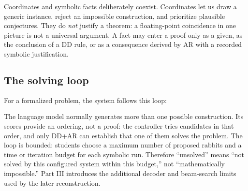 \documentclass[reqno]{amsart}
\DeclareMathOperator{\1}{\textbf{1}}
\begin{document}
Coordinates and symbolic facts deliberately coexist. Coordinates let us draw
a generic instance, reject an impossible construction, and prioritize
plausible conjectures. They do \emph{not} justify a theorem: a floating-point
coincidence in one picture is not a universal argument. A fact may enter a
proof only as a given, as the conclusion of a DD rule, or as a consequence
derived by AR with a recorded symbolic justification.

\subsection*{The solving loop}

For a formalized problem, the system follows this loop:
\begin{center}
\end{center}
The language model normally generates more than one possible construction.
Its scores provide an ordering, not a proof: the controller tries candidates
in that order, and only DD+AR can establish that one of them solves the
problem.
The loop is bounded: students choose a maximum number of proposed rabbits and
a time or iteration budget for each symbolic run. Therefore ``unsolved'' means
``not solved by this configured system within this budget,'' not
``mathematically impossible.'' Part III introduces the additional decoder and
beam-search limits used by the later reconstruction.
\end{document}
